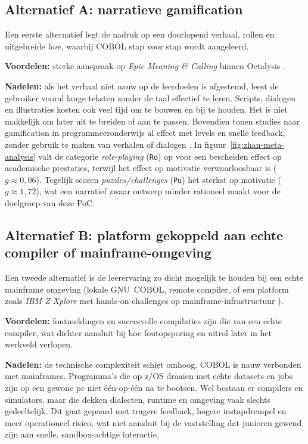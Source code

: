 \subsection{Alternatief A: narratieve gamification}
Een eerste alternatief legt de nadruk op een doorlopend verhaal, rollen en uitgebreide \textit{lore}, waarbij COBOL stap voor stap wordt aangeleerd.

\textbf{Voordelen:} sterke aanspraak op \textit{Epic Meaning \& Calling} binnen Octalysis \autocite{Chou2015}.

\textbf{Nadelen:} als het verhaal niet nauw op de leerdoelen is afgestemd, leest de gebruiker vooral lange teksten zonder de taal effectief te leren.
Scripts, dialogen en illustraties kosten ook veel tijd om te bouwen en bij te houden. Het is niet makkelijk om later uit te breiden of aan te passen.
Bovendien tonen studies naar gamification in programmeeronderwijs al effect met levels en snelle feedback, zonder gebruik te maken van verhalen of dialogen \autocite{Zhan2022}.
In figuur~\ref{fig:zhan-meta-analysis} valt de categorie \textit{role-playing} (\texttt{Ro}) op voor een bescheiden effect op academische prestaties, terwijl het effect op motivatie verwaarloosbaar is (\(g \approx 0{,}06\)).
Tegelijk scoren \textit{puzzles/challenges} (\texttt{Pu}) het sterkst op motivatie (\(g \approx 1{,}72\)), wat een narratief zwaar ontwerp minder rationeel maakt voor de doelgroep van deze PoC.

\subsection{Alternatief B: platform gekoppeld aan echte compiler of mainframe-omgeving}
Een tweede alternatief is de leerervaring zo dicht mogelijk te houden bij een echte mainframe omgeving (lokale GNU~COBOL, remote compiler, of een platform zoals \textit{IBM Z Xplore} met hands-on challenges op mainframe-infrastructuur \autocite{IBMZXplore2026}).

\textbf{Voordelen:} foutmeldingen en succesvolle compilaties zijn die van een echte compiler, wat dichter aansluit bij hoe foutopsporing en uitrol later in het werkveld verlopen.

\textbf{Nadelen:} de technische complexiteit schiet omhoog.
COBOL is nauw verbonden met mainframes. Programma's die op z/OS draaien met echte datasets en jobs zijn op een gewone pc niet één-op-één na te bootsen.
Wel bestaan er compilers en simulators, maar die dekken dialecten, runtime en omgeving vaak slechts gedeeltelijk.
Dit gaat gepaard met tragere feedback, hogere instapdrempel en meer operationeel risico, wat niet aansluit bij de vaststelling dat junioren gewend zijn aan snelle, sandbox-achtige interactie.

